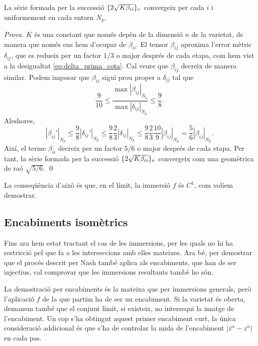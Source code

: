 \begin{prop}
    La sèrie formada per la successió $\{2\sqrt{K\beta_{ii}}\}_{\nu}$ convergeix per cada $i$ i uniformement en cada entorn $N_p$.
\end{prop}
{
\color{black} \textit{Prova.} 
$K$ és una constant que només depèn de la dimensió $n$ de la varietat, de manera que només ens hem d'ocupar de $\beta_{ii}$.
El tensor $\beta_{ij}$ aproxima l'error mètric $\delta_{ij}$, que es redueix per un factor $1/3$ o major després de cada etapa, com hem vist a la desigualtat \eqref{eq:delta_prima_cota}. Cal veure que $\beta_{ij}$ decreix de manera similar. Podem imposar que $\beta_{ij}$ sigui prou proper a $\delta_{ij}$ tal que 
\begin{equation}
    \frac{9}{10} \le \frac{\max|\beta_{ij}|_{N_p}}{\max|\delta_{ij}|_{N_p}} \le \frac{9}{8}.
\end{equation}
Aleshores,
\begin{equation}
    |\beta_{ij}'|_{N_p} \le \frac{9}{8}|\delta_{ij}'|_{N_p}\le \frac{9}{8}\frac{2}{3}|\delta_{ij}|_{N_p} \le \frac{9}{8}\frac{2}{3}\frac{10}{9}|\beta_{ij}|_{N_p} =  \frac{5}{6}|\beta_{ij}|_{N_p}.
\end{equation}
Així, el terme $\beta_{ii}$ decreix per un factor $5/6$ o major després de cada etapa. Per tant, la sèrie formada per la successió $\{2\sqrt{K\beta_{ii}}\}_{\nu}$ convergeix com una geomètrica de raó $\sqrt{5/6}$. \qed
}

\begin{obs}
    La conseqüència d'això és que, en el límit, la immersió $f$ és $C^1$, com volíem demostrar.
\end{obs}

\subsection{Encabiments isomètrics}

Fins ara hem estat tractant el cas de les immersions, per les quals no hi ha restricció pel que fa a les interseccions amb elles mateixes. Ara bé, per demostrar que el procés descrit per Nash també aplica als encabiments, que han de ser injectius, cal comprovar que les immersions resultants també ho són.

La demostració per encabiments és la mateixa que per immersions generals, però l'aplicació $f$ de la que partim ha de ser un encabiment. Si la varietat és oberta, demanem també que el conjunt límit, si existeix, no intersequi la imatge de l'encabiment. Un cop s'ha obtingut aquest primer encabiment curt, la única consideració addicional és que s'ha de controlar la mida de l'encabiment $|\overline z^\alpha - z^\alpha|$ en cada pas.

